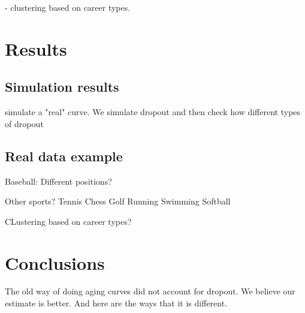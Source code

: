 \documentclass{article}\usepackage[]{graphicx}\usepackage[]{color}
\begin{document}
- clustering based on career types.  


\section{Results}

\subsection{Simulation results}
simulate a "real" curve.  We simulate dropout and then check how different types of dropout 

\subsection{Real data example}
Baseball: Different positions? 

Other sports?  
Tennis 
Chess 
Golf
Running
Swimming
Softball

CLustering based on career types?


\section{Conclusions}

The old way of doing aging curves did not account for dropout.  We believe our estimate is better.  And here are the ways that it is different.  
\cite{HeEtAl2011}



\end{document}
